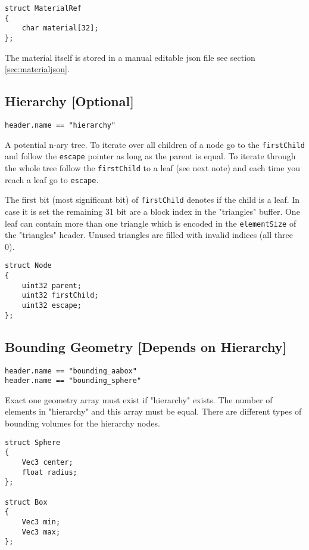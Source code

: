 \documentclass[english,10pt,a4paper,twocolumn,colorscheme=green]{orarticle}
\begin{document}
	\begin{lstlisting}
struct MaterialRef
{
	char material[32];
};
	\end{lstlisting}
	The material itself is stored in a manual editable json file see section \ref{sec:materialjson}.
	
	\subsection{Hierarchy [Optional]}
	\lstinline|header.name == "hierarchy"|
	
	A potential n-ary tree. To iterate over all children of a node go to the \lstinline|firstChild| and follow the \lstinline|escape| pointer as long as the parent is equal. To iterate through the whole tree follow the \lstinline|firstChild| to a leaf (see next note) and each time you reach a leaf go to \lstinline|escape|.
	
	The first bit (most significant bit) of \lstinline|firstChild| denotes if the child is a leaf. In case it is set the remaining 31 bit are a block index in the "triangles" buffer. One leaf can contain more than one triangle which is encoded in the \lstinline|elementSize| of the "triangles" header. Unused triangles are filled with invalid indices (all three 0).
	\begin{lstlisting}
struct Node
{
	uint32 parent;
	uint32 firstChild;
	uint32 escape;
};
	\end{lstlisting}
	
	\subsection{Bounding Geometry [Depends on Hierarchy]}
	\lstinline|header.name == "bounding_aabox"|\\
	\lstinline|header.name == "bounding_sphere"|
	
	Exact one geometry array must exist if "hierarchy" exists. The number of elements in "hierarchy" and this array must be equal. There are different types of bounding volumes for the hierarchy nodes.
	\begin{lstlisting}
struct Sphere
{
	Vec3 center;
	float radius;
};

struct Box
{
	Vec3 min;
	Vec3 max;
};
	\end{lstlisting}
	
	
		
\end{document}
